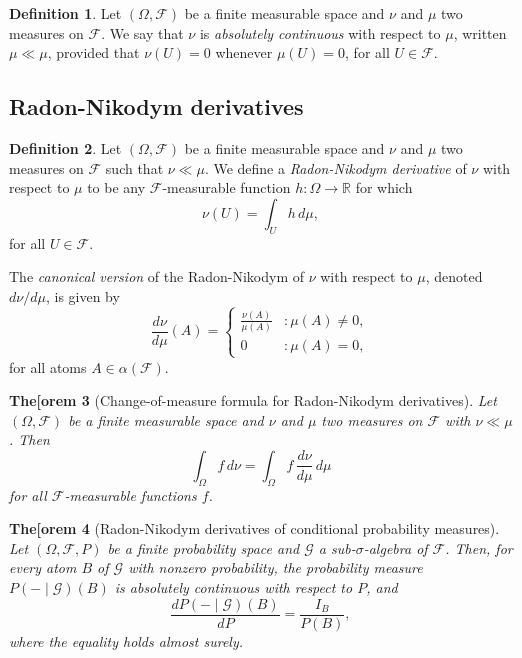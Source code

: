 \documentclass[11pt]{book}
\newtheorem{thm}{The[orem}[section]
\theoremstyle{definition}
\newtheorem{defn}[thm]{Definition}
\numberwithin{equation}{section}
\begin{document}
\begin{defn}
	Let $(\Omega, \mathcal{F})$ be a finite measurable space and $\nu$ and $\mu$ two measures on $\mathcal{F}$. We say that $\nu$ is \textit{absolutely continuous} with respect to $\mu$, written $\mu \ll \mu$,  provided that $\nu(U)=0$ whenever $\mu(U) = 0$, for all $U \in \mathcal{F}$.
\end{defn}

\subsection{Radon-Nikodym derivatives}

\begin{defn}
	Let $(\Omega, \mathcal{F})$ be a finite measurable space and $\nu$ and $\mu$ two measures on $\mathcal{F}$ such that $\nu \ll \mu$. We define a \textit{Radon-Nikodym derivative} of $\nu$ with respect to $\mu$ to be any $\mathcal{F}$-measurable function $h: \Omega \to \mathbb{R}$ for which
	\[
		\nu(U) = \int_U h \, d\mu,
	\]
	for all $U\in \mathcal{F}$.
\end{defn}

The \textit{canonical version} of the Radon-Nikodym of $\nu$ with respect to $\mu$, denoted $d\nu / d\mu$, is given by
\[
	\frac{d\nu}{d\mu}(A) = \begin{cases} \frac{\nu(A)}{\mu(A)} & : \mu(A) \neq 0, \\
	              0                     & : \mu(A) = 0,
	\end{cases}
\]
for all atoms $A\in \alpha(\mathcal{F})$.

\begin{thm}[Change-of-measure formula for Radon-Nikodym derivatives]\label{thm:change-vars}
	Let $(\Omega, \mathcal{F})$ be a finite measurable space and $\nu$ and $\mu$ two measures on $\mathcal{F}$ with $\nu \ll \mu$. Then
	\[
		\int_\Omega f \, d\nu = \int_\Omega f \, \frac{d\nu}{d\mu} \, d\mu
	\]
	for all $\mathcal{F}$-measurable functions $f$.
\end{thm}

\begin{thm}[Radon-Nikodym derivatives of conditional probability measures]
	Let $(\Omega, \mathcal{F}, P)$ be a finite probability space and $\mathcal{G}$ a sub-$\sigma$-algebra of $\mathcal{F}$. Then, for every atom $B$ of $\mathcal{G}$ with nonzero probability, the probability measure $P(- \mid \mathcal{G})(B)$ is absolutely continuous with respect to $P$, and
	\[
		\frac{d P(- \mid \mathcal{G})(B)}{dP} = \frac{I_B}{P(B)},
	\]
	where the equality holds almost surely.
\end{thm}
\end{document}
